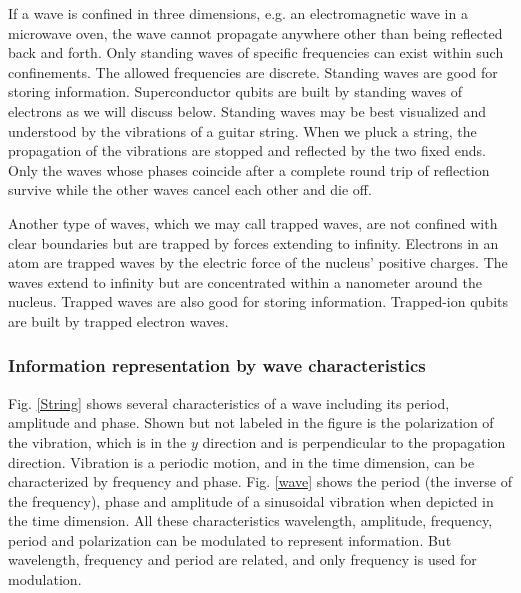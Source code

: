 \documentclass{book}
\begin{document}
If a wave is confined in three dimensions, e.g. an electromagnetic wave in a microwave oven, the wave cannot propagate anywhere other than being reflected back and forth. Only standing waves of specific frequencies can exist within such confinements. The allowed frequencies are discrete. Standing waves are good for storing information. Superconductor qubits are built by standing waves of electrons as we will discuss below. Standing waves may be best visualized and understood by the vibrations of a guitar string. When we pluck a string, the propagation of the vibrations are stopped and reflected by the two fixed ends. Only the waves whose phases coincide after a complete round trip of reflection survive while the other waves cancel each other and die off.

Another type of waves, which we may call trapped waves, are not confined with clear boundaries but are trapped by forces extending to infinity. Electrons in an atom are trapped waves by the electric force of the nucleus' positive charges. The waves extend to infinity but are concentrated within a nanometer around the nucleus. Trapped waves are also good for storing information. Trapped-ion qubits are built by trapped electron waves.





\subsubsection{Information representation by wave characteristics}
Fig. \ref{String} shows several characteristics of a wave including its period, amplitude and phase. Shown but not labeled in the figure is the polarization of the vibration, which is in the $y$ direction and is perpendicular to the propagation direction. Vibration is a periodic motion, and in the time dimension, can be characterized by frequency and phase. Fig. \ref{wave} shows the period (the inverse of the frequency), phase and amplitude of a sinusoidal vibration when depicted in the time dimension. All these characteristics wavelength, amplitude, frequency, period and polarization can be modulated to represent information. But wavelength, frequency and period are related, and only frequency is used for modulation.
\end{document}
